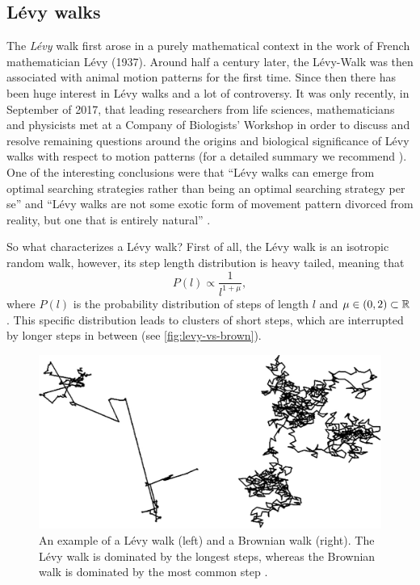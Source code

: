 \subsection{Lévy walks}\label{ssec:levy-walk}
The \textit{Lévy} walk first arose in a purely mathematical context in the work of French mathematician Lévy (1937). Around half a century later, the Lévy-Walk was then associated with animal motion patterns for the first time. Since then there has been huge interest in Lévy walks and a lot of controversy. It was only recently, in September of 2017, that leading researchers from life sciences, mathematicians and physicists met at a Company of Biologists' Workshop in order to discuss and resolve remaining questions around the origins and biological significance of Lévy walks with respect to motion patterns (for a detailed summary we recommend \cite{reynolds:2018}). One of the interesting conclusions were that ``Lévy walks can emerge from optimal searching strategies rather than being an optimal searching strategy per se'' and ``Lévy walks are not some exotic form of movement pattern divorced from reality, but one that is entirely natural'' \cite{reynolds:2018}.

So what characterizes a Lévy walk? First of all, the Lévy walk is an isotropic random walk, however, its step length distribution is heavy tailed, meaning that
\begin{equation*}
 P(l) \propto \frac{1}{l^{1+\mu}},
\end{equation*}
where $P(l)$ is the probability distribution of steps of length $l$ and $\mu \in (0,2) \subset \operatorname{\mathbb{R}}$. This specific distribution leads to clusters of short steps, which are interrupted by longer steps in between (see \autoref{fig:levy-vs-brown}).

\begin{figure}[bth]
 \myfloatalign
 \includegraphics[width=0.8\linewidth]{gfx/levy-vs-brown}
 \caption[Lévy vs. Brownian walk]{An example of a Lévy walk (left) and a Brownian walk (right). The Lévy walk is dominated by the longest steps, whereas the Brownian walk is dominated by the most common step \cite{reynolds:2018}.}\label{fig:levy-vs-brown}
\end{figure}


